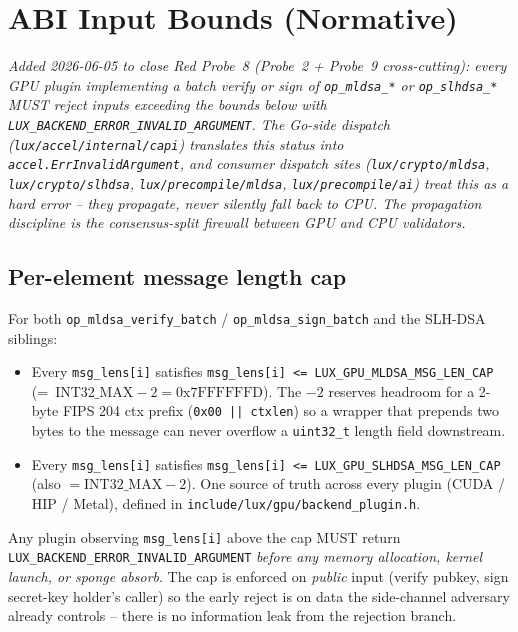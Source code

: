 \section{ABI Input Bounds (Normative)}
\label{sec:abi-input-bounds}

\emph{Added 2026-06-05 to close Red Probe~8 (Probe~2 + Probe~9
cross-cutting): every GPU plugin implementing a batch verify or
sign of \texttt{op\_mldsa\_*} or \texttt{op\_slhdsa\_*} MUST
reject inputs exceeding the bounds below with
\texttt{LUX\_BACKEND\_ERROR\_INVALID\_ARGUMENT}. The Go-side
dispatch (\texttt{lux/accel/internal/capi}) translates this status
into \texttt{accel.ErrInvalidArgument}, and consumer dispatch sites
(\texttt{lux/crypto/mldsa}, \texttt{lux/crypto/slhdsa},
\texttt{lux/precompile/mldsa}, \texttt{lux/precompile/ai}) treat
this as a hard error -- they propagate, never silently fall back to
CPU. The propagation discipline is the consensus-split firewall
between GPU and CPU validators.}

\subsection{Per-element message length cap}

For both \texttt{op\_mldsa\_verify\_batch} /
\texttt{op\_mldsa\_sign\_batch} and the SLH-DSA siblings:

\begin{itemize}[leftmargin=2em,nosep]
\item Every \texttt{msg\_lens[i]} satisfies
  \texttt{msg\_lens[i] <= LUX\_GPU\_MLDSA\_MSG\_LEN\_CAP}
  (=~$\text{INT32\_MAX}-2 = 0\text{x}7\text{FFFFFFD}$).
  The $-2$ reserves headroom for a 2-byte FIPS 204 ctx prefix
  (\texttt{0x00 || ctxlen}) so a wrapper that prepends two bytes
  to the message can never overflow a \texttt{uint32\_t} length
  field downstream.

\item Every \texttt{msg\_lens[i]} satisfies
  \texttt{msg\_lens[i] <= LUX\_GPU\_SLHDSA\_MSG\_LEN\_CAP}
  (also $= \text{INT32\_MAX}-2$). One source of truth across
  every plugin (CUDA / HIP / Metal), defined in
  \texttt{include/lux/gpu/backend\_plugin.h}.
\end{itemize}

Any plugin observing \texttt{msg\_lens[i]} above the cap MUST
return \texttt{LUX\_BACKEND\_ERROR\_INVALID\_ARGUMENT} \emph{before
any memory allocation, kernel launch, or sponge absorb}. The cap
is enforced on \emph{public} input (verify pubkey, sign secret-key
holder's caller) so the early reject is on data the side-channel
adversary already controls -- there is no information leak from
the rejection branch.

